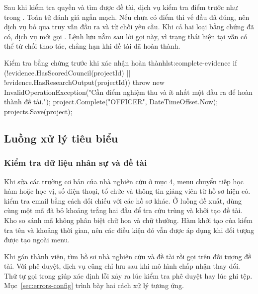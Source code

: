 Sau khi kiểm tra quyền và tìm được đề tài, dịch vụ kiểm tra điểm trước như trong . Toán tử \code{||} đánh giá ngắn mạch. Nếu chưa có điểm thì vế đầu đã đúng, nên dịch vụ bỏ qua truy vấn đầu ra và từ chối yêu cầu. Khi cả hai loại bằng chứng đã có, dịch vụ mới gọi . Lệnh lưu nằm sau lời gọi này, vì trạng thái hiện tại vẫn có thể từ chối thao tác, chẳng hạn khi đề tài đã hoàn thành.

\begin{ReportCode}[firstnumber=47,gobble=8]{Kiểm tra bằng chứng trước khi xác nhận hoàn thành}{lst:complete-evidence}
        if (!evidence.HasScoredCouncil(projectId) || !evidence.HasResearchOutput(projectId))
            throw new InvalidOperationException("Cần điểm nghiệm thu và ít nhất một đầu ra để hoàn thành đề tài.");
        project.Complete("OFFICER", DateTimeOffset.Now);
        projects.Save(project);
\end{ReportCode}

\subsection{Luồng xử lý tiêu biểu}\label{sec:implementation-flow}

\subsubsection{Kiểm tra dữ liệu nhân sự và đề tài}

Khi sửa các trường cơ bản của nhà nghiên cứu ở mục 4, menu chuyển tiếp học hàm hoặc học vị, số điện thoại, tổ chức và thông tin giảng viên từ hồ sơ hiện có.  kiểm tra email bằng cách đối chiếu với các hồ sơ khác. Ở luồng đề xuất,  dùng cùng một mã đã bỏ khoảng trắng hai đầu để tra cứu trùng và khởi tạo đề tài. Kho so sánh mã không phân biệt chữ hoa và chữ thường. Hàm khởi tạo của  kiểm tra tên và khoảng thời gian, nên các điều kiện đó vẫn được áp dụng khi đối tượng được tạo ngoài menu.

Khi gán thành viên,  tìm hồ sơ nhà nghiên cứu và đề tài rồi gọi  trên đối tượng đề tài. Với phê duyệt, dịch vụ cũng chỉ lưu sau khi mô hình chấp nhận thay đổi. Thứ tự gọi trong  giúp xác định lỗi xảy ra lúc kiểm tra phê duyệt hay lúc ghi tệp. Mục~\ref{sec:errors-config} trình bày hai cách xử lý tương ứng.

